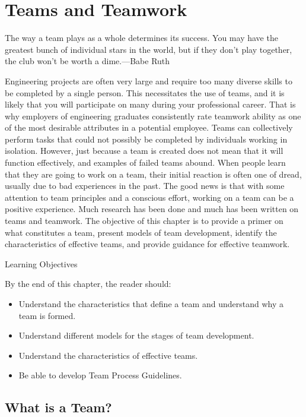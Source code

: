 \section{Teams and Teamwork}\label{teams-and-teamwork}

The way a team plays as a whole determines its success. You may have the
greatest bunch of individual stars in the world, but if they don't play
together, the club won't be worth a dime.---Babe Ruth

Engineering projects are often very large and require too many diverse
skills to be completed by a single person. This necessitates the use of
teams, and it is likely that you will participate on many during your
professional career. That is why employers of engineering graduates
consistently rate teamwork ability as one of the most desirable
attributes in a potential employee. Teams can collectively perform tasks
that could not possibly be completed by individuals working in
isolation. However, just because a team is created does not mean that it
will function effectively, and examples of failed teams abound. When
people learn that they are going to work on a team, their initial
reaction is often one of dread, usually due to bad experiences in the
past. The good news is that with some attention to team principles and a
conscious effort, working on a team can be a positive experience. Much
research has been done and much has been written on teams and teamwork.
The objective of this chapter is to provide a primer on what constitutes
a team, present models of team development, identify the characteristics
of effective teams, and provide guidance for effective teamwork.

Learning Objectives

By the end of this chapter, the reader should:

\begin{itemize}
\item
  Understand the characteristics that define a team and understand why a
  team is formed.
\item
  Understand different models for the stages of team development.
\item
  Understand the characteristics of effective teams.
\item
  Be able to develop Team Process Guidelines.
\end{itemize}

\subsection{What is a Team?}\label{what-is-a-team}

